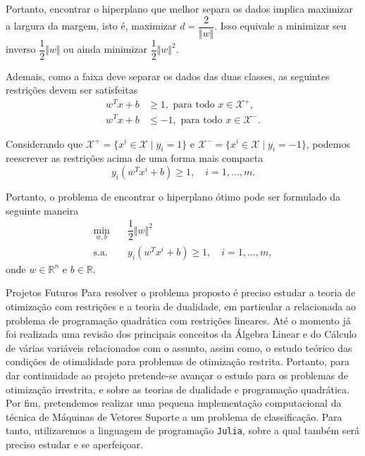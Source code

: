 \documentclass[12pt]{beamer}
\def\Xset{\mathcal{X}}
\def\RR{\mathds{R}}
\theoremstyle{definition}%
\begin{document}

\begin{frame}
Portanto, encontrar o hiperplano que melhor separa os dados implica maximizar a largura da margem, isto é, maximizar $d=\dfrac{2}{\Vert w\Vert }$. Isso equivale a minimizar seu inverso $\dfrac{1}{2}\Vert w\Vert $ ou ainda minimizar $\dfrac{1}{2}\Vert w\Vert^{2}$.

Ademais, como a faixa deve separar os dados das duas classes, as seguintes restrições devem ser satisfeitas
\begin{align}
w^{T}x+b &\geq 1 , \text{ para  todo } x\in \Xset^{+}, \\
w^{T}x+b &\leq -1 , \text{ para  todo } x\in \Xset^{-}.
\end{align}

Considerando que $\Xset^{+}=\{x^i \in \Xset\mid y_i=1\}$ e $\Xset^{-}=\{x^i \in \Xset \mid y_i=-1\}$, podemos reescrever as restrições acima de uma forma mais compacta 
\[ y_{i}(w^{T}x^{i}+b)\geq 1, \quad i=1, \ldots ,m. \]
\end{frame}


\begin{frame}
Portanto, o problema de encontrar o hiperplano ótimo pode ser formulado da seguinte maneira
\[ \label{eq5}
\begin{aligned}
\min_{w,b} & \quad \dfrac{1}{2} \Vert w\Vert^{2} \\
\text{s.a.} &  \quad y_i(w^{T}x^{i}+b) \geq 1, \quad i=1, \ldots , m, \end{aligned}
\]
onde $w\in \RR^{n}$ e $b\in \RR$. 
\end{frame}


\begin{frame}{Projetos Futuros}
Para resolver o problema proposto é preciso estudar a teoria de otimização com restrições e a teoria de dualidade, em particular a relacionada ao problema de programação quadrática com restrições lineares. Até o momento já foi realizada uma revisão dos principais conceitos da Álgebra Linear e do Cálculo de várias variáveis relacionados com o assunto, assim como, o estudo teórico das condições de otimalidade para problemas de otimização restrita. Portanto, para dar continuidade ao projeto pretende-se avançar o estudo para os problemas de otimização irrestrita, e sobre as teorias de dualidade e programação quadrática. Por fim, pretendemos realizar uma pequena implementação computacional da técnica de Máquinas de Vetores Suporte a um problema de classificação. Para tanto, utilizaremos a linguagem de programação \texttt{Julia}, sobre a qual também será preciso estudar e se aperfeiçoar.
\end{frame}

\begin{frame}
\printbibliography
\end{frame}
\end{document}

